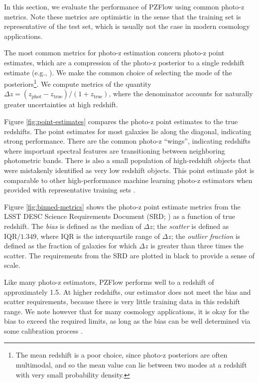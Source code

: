 \documentclass[twocolumn,twocolappendix]{aastex631}
\begin{document}
In this section, we evaluate the performance of PZFlow using common photo-z metrics.
Note these metrics are optimistic in the sense that the training set is representative of the test set, which is usually not the case in modern cosmology applications.

The most common metrics for photo-z estimation concern photo-z point estimates, which are a compression of the photo-z posterior to a single redshift estimate (e.g., \citealt{hildebrandt2010,sanchez2014}).
We make the common choice of selecting the mode of the posteriors\footnote{The mean redshift is a poor choice, since photo-z posteriors are often multimodal, and so the mean value can lie between two modes at a redshift with very small probability density.}.
We compute metrics of the quantity $\Delta z = (z_\text{phot} - z_\text{true}) / (1 + z_\text{true})$, where the denominator accounts for naturally greater uncertainties at high redshift.

Figure \ref{fig:point-estimates} compares the photo-z point estimates to the true redshifts.
The point estimates for most galaxies lie along the diagonal, indicating strong performance.
There are the common photo-z ``wings'', indicating redshifts where important spectral features are transitioning between neighboring photometric bands.
There is also a small population of high-redshift objects that were mistakenly identified as very low redshift objects.
This point estimate plot is comparable to other high-performance machine learning photo-z estimators when provided with representative training sets \citep{sanchez2014}.

Figure \ref{fig:binned-metrics} shows the photo-z point estimate metrics from the LSST DESC Science Requirements Document (SRD; \citealt{descSRD}) as a function of true redshift.
The \emph{bias} is defined as the median of $\Delta z$; the \emph{scatter} is defined as $\text{IQR} / 1.349$, where IQR is the interquartile range of $\Delta z$; the \emph{outlier fraction} is defined as the fraction of galaxies for which $\Delta z$ is greater than three times the scatter.
The requirements from the SRD are plotted in black to provide a sense of scale.

Like many photo-z estimators, PZFlow performs well to a redshift of approximately 1.5.
At higher redshifts, our estimator does not meet the bias and scatter requirements, because there is very little training data in this redshift range.
We note however that for many cosmology applications, it is okay for the bias to exceed the required limits, as long as the bias can be well determined via some calibration process \citep{newman2015}.
\end{document}
